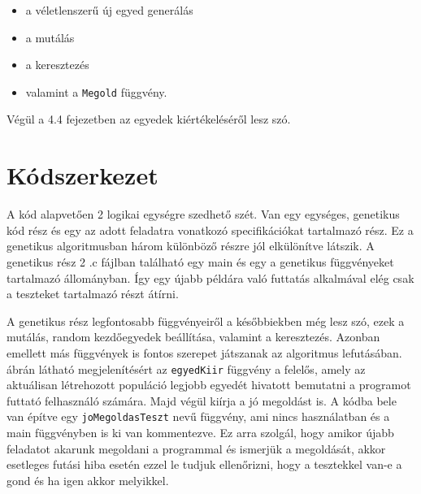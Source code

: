 \documentclass[12pt,a4paper,oneside]{report}
\begin{document}
	\begin{itemize}
	\item a véletlenszerű új egyed generálás
	\item a mutálás
	\item a keresztezés
	\item  valamint a \texttt{Megold} függvény.
	\end{itemize}

	{Végül a 4.4 fejezetben az egyedek kiértékeléséről lesz szó.}


    \section{Kódszerkezet} %
		A kód alapvetően 2 logikai egységre szedhető szét.
		Van egy egységes, genetikus kód rész és egy az adott feladatra vonatkozó specifikációkat tartalmazó rész.
		Ez a genetikus algoritmusban három különböző részre jól elkülönítve látszik.
		A genetikus rész 2 .c fájlban található egy main és egy a genetikus függvényeket tartalmazó állományban.
		Így egy újabb példára való futtatás alkalmával elég csak a teszteket tartalmazó részt átírni.
		
		
		A genetikus rész legfontosabb függvényeiről a későbbiekben még lesz szó, ezek a mutálás, random kezdőegyedek beállítása, valamint a keresztezés.
		Azonban emellett más függvények is fontos szerepet játszanak az algoritmus lefutásában.
		 ábrán látható megjelenítésért az \texttt{egyedKiir} függvény a felelős, amely az aktuálisan létrehozott populáció legjobb egyedét hivatott bemutatni a programot futtató felhasználó számára.
		Majd végül kiírja a jó megoldást is.
		A kódba bele van építve egy \texttt{joMegoldasTeszt} nevű függvény, ami nincs használatban és a main függvényben is ki van kommentezve.
		Ez arra szolgál, hogy amikor újabb feladatot akarunk megoldani a programmal és ismerjük a megoldását, akkor esetleges futási hiba esetén ezzel le tudjuk ellenőrizni, hogy a tesztekkel van-e a gond és ha igen akkor melyikkel.
		
		
\end{document}
